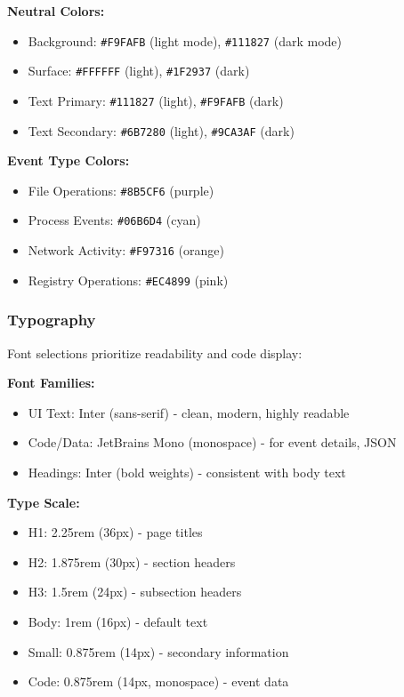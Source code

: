 \textbf{Neutral Colors:}
\begin{itemize}
    \item Background: \texttt{\#F9FAFB} (light mode), \texttt{\#111827} (dark mode)
    \item Surface: \texttt{\#FFFFFF} (light), \texttt{\#1F2937} (dark)
    \item Text Primary: \texttt{\#111827} (light), \texttt{\#F9FAFB} (dark)
    \item Text Secondary: \texttt{\#6B7280} (light), \texttt{\#9CA3AF} (dark)
\end{itemize}

\textbf{Event Type Colors:}
\begin{itemize}
    \item File Operations: \texttt{\#8B5CF6} (purple)
    \item Process Events: \texttt{\#06B6D4} (cyan)
    \item Network Activity: \texttt{\#F97316} (orange)
    \item Registry Operations: \texttt{\#EC4899} (pink)
\end{itemize}

\subsubsection{Typography}

Font selections prioritize readability and code display:

\textbf{Font Families:}
\begin{itemize}
    \item UI Text: Inter (sans-serif) - clean, modern, highly readable
    \item Code/Data: JetBrains Mono (monospace) - for event details, JSON
    \item Headings: Inter (bold weights) - consistent with body text
\end{itemize}

\textbf{Type Scale:}
\begin{itemize}
    \item H1: 2.25rem (36px) - page titles
    \item H2: 1.875rem (30px) - section headers
    \item H3: 1.5rem (24px) - subsection headers
    \item Body: 1rem (16px) - default text
    \item Small: 0.875rem (14px) - secondary information
    \item Code: 0.875rem (14px, monospace) - event data
\end{itemize}

